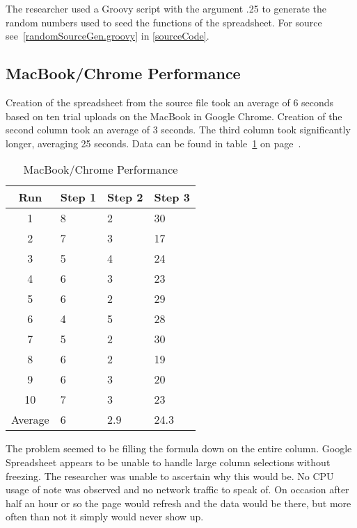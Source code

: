 The researcher used a Groovy script with the argument .25 to generate the random
numbers used to seed the functions of the spreadsheet.  For source
see~\ref{randomSourceGen.groovy} in \ref{sourceCode}.

\subsection{MacBook/Chrome Performance}

Creation of the spreadsheet from the source file took an average of 6 seconds
based on ten trial uploads on the MacBook in Google Chrome. Creation of the
second column took an average of 3 seconds. The third column took significantly
longer, averaging 25 seconds. Data can be found in table~\ref{mbChromePerf} on
page~\pageref{mbChromePerf}.

\begin{table}
  \begin{tabular}{| c | l | l | l |}
    \hline
    Run      & Step 1 & Step 2 & Step 3 \\ \hline
    1        & 8      & 2      & 30     \\ \hline
    2        & 7      & 3      & 17     \\ \hline
    3        & 5      & 4      & 24     \\ \hline
    4        & 6      & 3      & 23     \\ \hline
    5        & 6      & 2      & 29     \\ \hline
    6        & 4      & 5      & 28     \\ \hline
    7        & 5      & 2      & 30     \\ \hline
    8        & 6      & 2      & 19     \\ \hline
    9        & 6      & 3      & 20     \\ \hline
    10       & 7      & 3      & 23     \\ \hline
    Average  & 6      & 2.9    & 24.3   \\
    \hline
  \end{tabular}
  \caption{MacBook/Chrome Performance}
  \label{mbChromePerf}
\end{table}

The problem seemed to be filling the formula down on the entire column.  Google
Spreadsheet appears to be unable to handle large column selections without
freezing.  The researcher was unable to ascertain why this would be.  No CPU
usage of note was observed and no network traffic to speak of.  On occasion
after half an hour or so the page would refresh and the data would be there, but
more often than not it simply would never show up.

